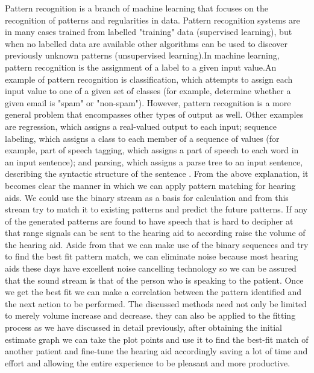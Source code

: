 \documentclass[sigconf]{acmart}
\begin{document}
 
Pattern recognition is a branch of machine learning that focuses on the recognition of patterns and regularities in data. Pattern recognition systems are in many cases trained from labelled "training" data (supervised learning), but when no labelled data are available other algorithms can be used to discover previously unknown patterns (unsupervised learning).In machine learning, pattern recognition is the assignment of a label to a given input value.An example of pattern recognition is classification, which attempts to assign each input value to one of a given set of classes (for example, determine whether a given email is "spam" or "non-spam"). However, pattern recognition is a more general problem that encompasses other types of output as well. Other examples are regression, which assigns a real-valued output to each input; sequence labeling, which assigns a class to each member of a sequence of values (for example, part of speech tagging, which assigns a part of speech to each word in an input sentence); and parsing, which assigns a parse tree to an input sentence, describing the syntactic structure of the sentence \cite{2017b}.
\newline
From the above explanation, it becomes clear the manner in which we can apply pattern matching for hearing aids. We could use the binary stream as a basis for calculation and from this stream try to match it to existing patterns and predict the future patterns. If any of the generated patterns are found to have speech that is hard to decipher at that range signals can be sent to the hearing aid to according raise the volume of the hearing aid. Aside from that we can make use of the binary sequences and try to find the best fit pattern match, we can eliminate noise because most hearing aids these days have excellent noise cancelling technology so we can be assured that the sound stream is that of the person who is speaking to the patient. Once we get the best fit we can make a correlation between the pattern identified and the next action to be performed. 
\newline
The discussed methods need not only be limited to merely volume increase and decrease. they can also be applied to the fitting process as we have discussed in detail previously, after obtaining the initial estimate graph we can take the plot points and use it to find the best-fit match of another patient  and fine-tune the hearing aid accordingly saving a lot of time and effort and allowing the entire experience to be pleasant and more productive.
\newline
\end{document}
